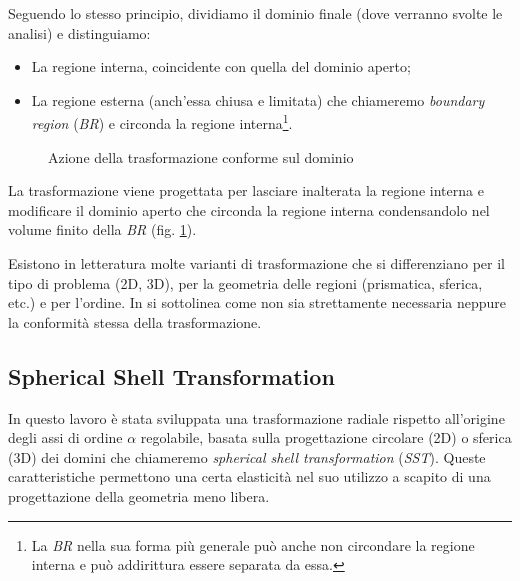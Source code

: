 Seguendo lo stesso principio, dividiamo il dominio finale (dove verranno svolte le analisi) e distinguiamo:
\begin{itemize}
\item La regione interna, coincidente con quella del dominio aperto;
\item La regione esterna (anch'essa chiusa e limitata) che chiameremo \textit{boundary region} (\textit{BR}) e circonda la regione interna\footnote{La \textit{BR} nella sua forma più generale può anche non circondare la regione interna e può addirittura essere separata da essa.}.
\end{itemize}

\begin{figure}[htp]
\centering
\caption{Azione della trasformazione conforme sul dominio}
\label{fig:4.9}
\end{figure}


La trasformazione viene progettata per lasciare inalterata la regione interna e modificare il dominio aperto che circonda la regione interna condensandolo nel volume finito della \textit{BR} (fig. \ref{fig:4.9}).

Esistono in letteratura molte varianti di trasformazione che si differenziano per il tipo di problema (2D, 3D), per la geometria delle regioni (prismatica, sferica, etc.) e per l'ordine. In \cite{brunotte_finite_1992} si sottolinea come non sia strettamente necessaria neppure la conformità stessa della trasformazione.

\subsection{Spherical Shell Transformation}

In questo lavoro è stata sviluppata una trasformazione radiale rispetto all'origine degli assi di ordine $\alpha$ regolabile, basata sulla progettazione circolare (2D) o sferica (3D) dei domini che chiameremo \textit{spherical shell transformation} (\textit{SST}). Queste caratteristiche permettono una certa elasticità nel suo utilizzo a scapito di una progettazione della geometria meno libera.

